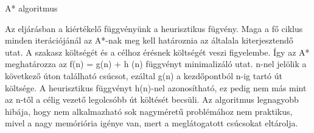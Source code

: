 

A* algoritmus

Az eljárásban a kiértékelő függvényünk a heurisztikus fügvény. Maga a fő ciklus minden iterációjánál az A*-nak meg kell határoznia az általala kiterjesztendő utat. A szakasz költségét és a célhoz érésnek költségét veszi figyelembe. Így az A* meghatározza az f(n) = g(n) + h (n) függvényt minimalizáló utat. n-nel jelölik a következő úton található csúcsot, ezáltal g(n) a kezdőpontból n-ig tartó út költsége. A heurisztikus függvényt h(n)-nel azonosítható, ez pedig nem más mint az n-től a célig vezető legolcsóbb út költését becsüli.
Az algoritmus legnagyobb hibája, hogy nem alkalmazható sok nagyméretű problémához nem praktikus, mivel a nagy memóriória igénye van, mert a meglátogatott csúcsokat eltárolja.

